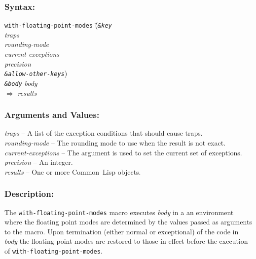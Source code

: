 \documentclass[fleqn]{article}
\newcommand{\CL}{\textsf{Common~Lisp}}
\newcommand{\code}[1]{\texttt{#1}}
\newcommand{\varname}[1]{\textit{#1}}
\newcommand{\DSyntax}{\subsubsection*{Syntax:}}
\begin{document}
\DSyntax{}


\begin{tabbing}
\code{with-floating-point-modes} \=(\=\textit{\code{\&key}}\\
\>\>                                \varname{traps}\\
\>\>                                \varname{rounding-mode}\\
\>\>                                \varname{current-exceptions}\\
\>\>                                \varname{precision}\\
\>\>                                \varname{\code{\&allow-other-keys}})\\
\>                           \varname{\code{\&body}} \varname{body}\\
$\Rightarrow$ \varname{results}
\end{tabbing}




\subsubsection*{Arguments and Values:}

\varname{traps} -- A list of the exception conditions that should cause
traps.\\
\varname{rounding-mode} -- The rounding mode to use when the result is
not exact.\\
\varname{current-exceptions} -- The argument is used to set the current
set of exceptions.\\
\varname{precision} -- An integer.\\
\varname{results} -- One or more \CL{} objects.


\subsubsection*{Description:}

The \code{with-floating-point-modes} macro executes \varname{body} in a
an environment where the floating point modes are determined by the
values passed as arguments to the macro.  Upon termination (either
normal or exceptional) of the code in \varname{body} the floating
point modes are restored to those in effect before the execution of
\code{with-floating-point-modes}.
\end{document}
